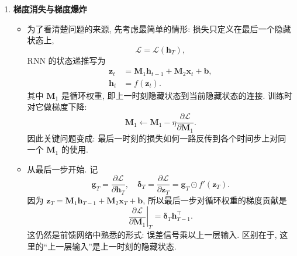 \documentclass{../nndlcourse}
\begin{document}
\begin{enumerate}
\item \textbf{梯度消失与梯度爆炸}
  \begin{itemize}
    \item 为了看清楚问题的来源, 先考虑最简单的情形: 损失只定义在最后一个隐藏状态上,
    \begin{equation*}
      \mathcal{L}=\mathcal{L}(\boldsymbol{h}_T),
    \end{equation*}
    RNN 的状态递推写为
    \begin{align*}
      \boldsymbol{z}_t
      &= \boldsymbol{M}_1\boldsymbol{h}_{t-1}
       + \boldsymbol{M}_2\boldsymbol{x}_t
       + \boldsymbol{b}, \\
      \boldsymbol{h}_t &= f(\boldsymbol{z}_t).
    \end{align*}
    其中 $\boldsymbol{M}_1$ 是循环权重, 即上一时刻隐藏状态到当前隐藏状态的连接. 训练时对它做梯度下降:
    \begin{equation*}
      \boldsymbol{M}_1
      \leftarrow
      \boldsymbol{M}_1
      -\eta
      \frac{\partial \mathcal{L}}{\partial \boldsymbol{M}_1}.
    \end{equation*}
    因此关键问题变成: 最后一时刻的损失如何一路反传到各个时间步上对同一个 $\boldsymbol{M}_1$ 的使用.

    \item 从最后一步开始. 记
    \begin{equation*}
      \boldsymbol{g}_T
      =
      \frac{\partial \mathcal{L}}{\partial \boldsymbol{h}_T},
      \quad
      \boldsymbol{\delta}_T
      =
      \frac{\partial \mathcal{L}}{\partial \boldsymbol{z}_T}
      =
      \boldsymbol{g}_T \odot f'(\boldsymbol{z}_T).
    \end{equation*}
    因为 $\boldsymbol{z}_T=\boldsymbol{M}_1\boldsymbol{h}_{T-1}+\boldsymbol{M}_2\boldsymbol{x}_T+\boldsymbol{b}$, 所以最后一步对循环权重的梯度贡献是
    \begin{equation*}
      \left.\frac{\partial \mathcal{L}}{\partial \boldsymbol{M}_1}\right|_{T}
      =
      \boldsymbol{\delta}_T\boldsymbol{h}_{T-1}^{\top}.
    \end{equation*}
    这仍然是前馈网络中熟悉的形式: 误差信号乘以上一层输入. 区别在于, 这里的“上一层输入”是上一时刻的隐藏状态.


\end{itemize}
\end{enumerate}
\end{document}
